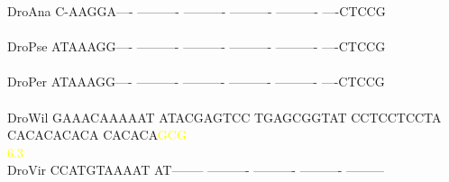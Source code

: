 \documentclass[11pt,twoside,reqno,a4paper]{article}
\begin{document}
{DroAna	C-AAGGA----	----------	----------	----------	----------	----CTCCG\\
\hspace*{7\charwidth}\hspace*{1\charwidth}\hspace*{1\charwidth}\hspace*{1\charwidth}\hspace*{1\charwidth}\hspace*{1\charwidth}\\
DroPse	ATAAAGG----	----------	----------	----------	----------	----CTCCG\\
\hspace*{7\charwidth}\hspace*{1\charwidth}\hspace*{1\charwidth}\hspace*{1\charwidth}\hspace*{1\charwidth}\hspace*{1\charwidth}\\
DroPer	ATAAAGG----	----------	----------	----------	----------	----CTCCG\\
\hspace*{7\charwidth}\hspace*{1\charwidth}\hspace*{1\charwidth}\hspace*{1\charwidth}\hspace*{1\charwidth}\hspace*{1\charwidth}\\
DroWil	GAAACAAAAAT	ATACGAGTCC	TGAGCGGTAT	CCTCCTCCTA	CACACACACA	CACACA\textcolor{Yellow}{G}\textcolor{Yellow}{C}\textcolor{Yellow}{G}\\
\hspace*{7\charwidth}\hspace*{1\charwidth}\hspace*{1\charwidth}\hspace*{1\charwidth}\hspace*{1\charwidth}\hspace*{1\charwidth}\hspace*{57\charwidth}\textcolor{Yellow}{6.3}\hspace*{1\charwidth}\\
DroVir	CCATGTAAAAT	AT--------	----------	----------	----------	---------\\
\hspace*{7\charwidth}\hspace*{1\charwidth}\hspace*{1\charwidth}\hspace*{1\charwidth}\hspace*{1\charwidth}\hspace*{1\charwidth}\\
}
\end{document}
